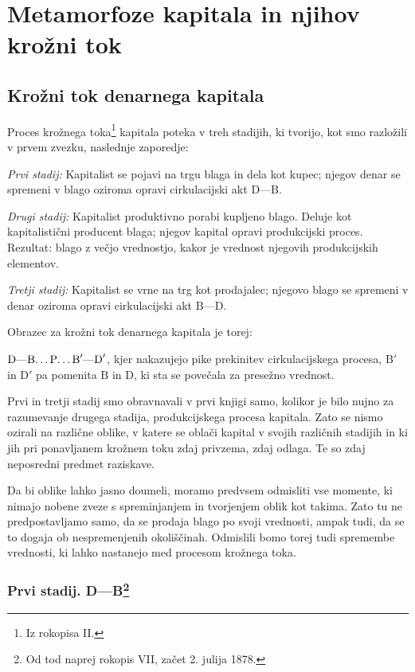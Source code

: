 \documentclass[a5paper]{scrbook}
\newcommand{\D}{\textrm{D}}
\newcommand{\crta}{\textrm{---}}
\newcommand{\B}{\textrm{B}}
\newcommand{\pike}{\textrm{\dots}}
\newcommand{\pro}{\textrm{P}}
\begin{document}
\part{Metamorfoze kapitala in njihov krožni tok}

\chapter{Krožni tok denarnega kapitala}

Proces krožnega toka\footnote{Iz rokopisa II.} kapitala poteka v treh stadijih, ki tvorijo, kot smo razložili v prvem zvezku, naslednje zaporedje:

\emph{Prvi stadij:} Kapitalist se pojavi na trgu blaga in dela kot kupec; njegov denar se spremeni v blago oziroma opravi cirkulacijski akt \( \D\crta\B \).

\emph{Drugi stadij:} Kapitalist produktivno porabi kupljeno blago. Deluje kot kapitalistični producent blaga; njegov kapital opravi produkcijski proces. Rezultat: blago z večjo vrednostjo, kakor je vrednost njegovih produkcijskih elementov.

\emph{Tretji stadij:} Kapitalist se vrne na trg kot prodajalec; njegovo blago se spremeni v denar oziroma opravi cirkulacijski akt \( \B\crta\D \).

Obrazec za krožni tok denarnega kapitala je torej:

\( \D\crta\B\pike\pro\pike\B'\crta\D' \), kjer nakazujejo pike prekinitev cirkulacijskega procesa, \( \B' \) in \( \D' \) pa pomenita \( \B \) in \( \D \), ki sta se povečala za presežno vrednost.

Prvi in tretji stadij smo obravnavali v prvi knjigi samo, kolikor je bilo nujno za razumevanje drugega stadija, produkcijskega procesa kapitala. Zato se nismo ozirali na različne oblike, v katere se oblači kapital v svojih različnih stadijih in ki jih pri ponavljanem krožnem toku zdaj privzema, zdaj odlaga. Te so zdaj neposredni predmet raziskave.

Da bi oblike lahko jasno doumeli, moramo predvsem odmisliti vse momente, ki nimajo nobene zveze s spreminjanjem in tvorjenjem oblik kot takima. Zato tu ne predpostavljamo samo, da se prodaja blago po svoji vrednosti, ampak tudi, da se to dogaja ob nespremenjenih okoliščinah. Odmislili bomo torej tudi spremembe vrednosti, ki lahko nastanejo med procesom krožnega toka.

\section{Prvi stadij. D---B\footnote{Od tod naprej rokopis VII, začet 2. julija 1878.}}
\end{document}
